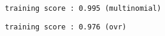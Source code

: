 \begin{Verbatim}[commandchars=\\\{\}]
training score : 0.995 (multinomial)
\end{Verbatim}

\begin{Verbatim}[commandchars=\\\{\}]
training score : 0.976 (ovr)
\end{Verbatim}
